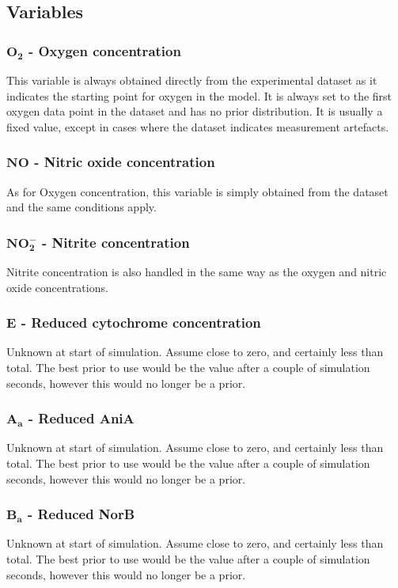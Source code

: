 \subsection*{Variables}
\subsubsection*{$\mathbf{O_2}$ {\bf- Oxygen concentration}}
This variable is always obtained directly from the experimental dataset as it indicates the starting point for oxygen in the model. It is always set to the first oxygen data point in the dataset and has no prior distribution. It is usually a fixed value, except in cases where the dataset indicates measurement artefacts.

\subsubsection*{$\mathbf{NO}$ {\bf- Nitric oxide concentration}}
As for Oxygen concentration, this variable is simply obtained from the dataset and the same conditions apply.

\subsubsection*{$\mathbf{NO_2^-}$ {\bf- Nitrite concentration}}
Nitrite concentration is also handled in the same way as the oxygen and nitric oxide concentrations.

\subsubsection*{$\mathbf{E}$ {\bf- Reduced cytochrome concentration}}
Unknown at start of simulation. Assume close to zero, and certainly less than total. The best prior to use would be the value after a couple of simulation seconds, however this would no longer be a prior.

\subsubsection*{$\mathbf{A_a}$ {\bf- Reduced AniA}}
Unknown at start of simulation. Assume close to zero, and certainly less than total. The best prior to use would be the value after a couple of simulation seconds, however this would no longer be a prior.

\subsubsection*{$\mathbf{B_a}$ {\bf- Reduced NorB}}
Unknown at start of simulation. Assume close to zero, and certainly less than total. The best prior to use would be the value after a couple of simulation seconds, however this would no longer be a prior.

